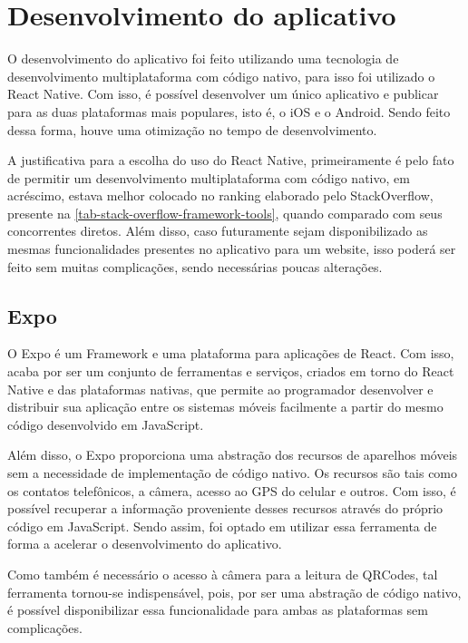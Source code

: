 \section{Desenvolvimento do aplicativo}\label{desenvApp}

O desenvolvimento do aplicativo foi feito utilizando uma tecnologia de desenvolvimento multiplataforma com código nativo, para isso foi utilizado o React Native. Com isso, é possível desenvolver um único aplicativo e publicar para as duas plataformas mais populares, isto é, o iOS e o Android\cite{reactNativeAbout}. Sendo feito dessa forma, houve uma otimização no tempo de desenvolvimento.

A justificativa para a escolha do uso do React Native, primeiramente é pelo fato de permitir um desenvolvimento multiplataforma com código nativo, em acréscimo, estava melhor colocado no ranking elaborado pelo StackOverflow, presente na \autoref{tab-stack-overflow-framework-tools}, quando comparado com seus concorrentes diretos. Além disso, caso futuramente sejam disponibilizado as mesmas funcionalidades presentes no aplicativo para um website, isso poderá ser feito sem muitas complicações, sendo necessárias poucas alterações.

\subsection{Expo}

O Expo é um Framework e uma plataforma para aplicações de React. Com isso, acaba por ser um conjunto de ferramentas e serviços, criados em torno do React Native e das plataformas nativas, que permite ao programador desenvolver e distribuir sua aplicação entre os sistemas móveis facilmente a partir do mesmo código desenvolvido em JavaScript.\cite{expo}

Além disso, o Expo proporciona uma abstração dos recursos de aparelhos móveis sem a necessidade de implementação de código nativo. Os recursos são tais como os contatos telefônicos, a câmera, acesso ao GPS do celular e outros. Com isso, é possível recuperar a informação proveniente desses recursos através do próprio código em JavaScript. Sendo assim, foi optado em utilizar essa ferramenta de forma a acelerar o desenvolvimento do aplicativo.\cite{expoOverview}

Como também é necessário o acesso à câmera para a leitura de QRCodes, tal ferramenta tornou-se indispensável, pois, por ser uma abstração de código nativo, é possível disponibilizar essa funcionalidade para ambas as plataformas sem complicações.

